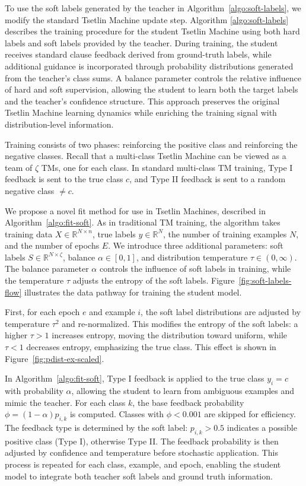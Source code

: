 \documentclass[sn-mathphys-num]{sn-jnl}%
\theoremstyle{thmstyleone}%
\theoremstyle{thmstyletwo}%
\theoremstyle{thmstylethree}%
\begin{document}
To use the soft labels generated by the teacher in Algorithm~\ref{algo:soft-labels}, we modify the standard Tsetlin Machine update step. Algorithm \ref{algo:soft-labels} describes the training procedure for the student Tsetlin Machine using both hard labels and soft labels provided by the teacher. During training, the student receives standard clause feedback derived from ground-truth labels, while additional guidance is incorporated through probability distributions generated from the teacher’s class sums. A balance parameter controls the relative influence of hard and soft supervision, allowing the student to learn both the target labels and the teacher’s confidence structure. This approach preserves the original Tsetlin Machine learning dynamics while enriching the training signal with distribution-level information.

Training consists of two phases: reinforcing the positive class and reinforcing the negative classes. Recall that a multi-class Tsetlin Machine can be viewed as a team of $\zeta$ TMs, one for each class. In standard multi-class TM training, Type I feedback is sent to the true class $c$, and Type II feedback is sent to a random negative class $\neq c$.

We propose a novel fit method for use in Tsetlin Machines, described in Algorithm~\ref{algo:fit-soft}. As in traditional TM training, the algorithm takes training data $X \in \mathbb{R}^{N \times n}$, true labels $y \in \mathbb{R}^N$, the number of training examples $N$, and the number of epochs $E$. We introduce three additional parameters: soft labels $S \in \mathbb{R}^{N \times \zeta}$, balance $\alpha \in [0,1]$, and distribution temperature $\tau \in (0,\infty)$. The balance parameter $\alpha$ controls the influence of soft labels in training, while the temperature $\tau$ adjusts the entropy of the soft labels. Figure~\ref{fig:soft-labels-flow} illustrates the data pathway for training the student model.

First, for each epoch $e$ and example $i$, the soft label distributions are adjusted by temperature $\tau^2$ and re-normalized. This modifies the entropy of the soft labels: a higher $\tau>1$ increases entropy, moving the distribution toward uniform, while $\tau<1$ decreases entropy, emphasizing the true class. This effect is shown in Figure~\ref{fig:pdist-ex-scaled}.

In Algorithm~\ref{algo:fit-soft}, Type I feedback is applied to the true class $y_i=c$ with probability $\alpha$, allowing the student to learn from ambiguous examples and mimic the teacher. For each class $k$, the base feedback probability $\phi = (1-\alpha) p_{i,k}$ is computed. Classes with $\phi < 0.001$ are skipped for efficiency. The feedback type is determined by the soft label: $p_{i,k} > 0.5$ indicates a possible positive class (Type I), otherwise Type II. The feedback probability is then adjusted by confidence and temperature before stochastic application. This process is repeated for each class, example, and epoch, enabling the student model to integrate both teacher soft labels and ground truth information.
\end{document}
